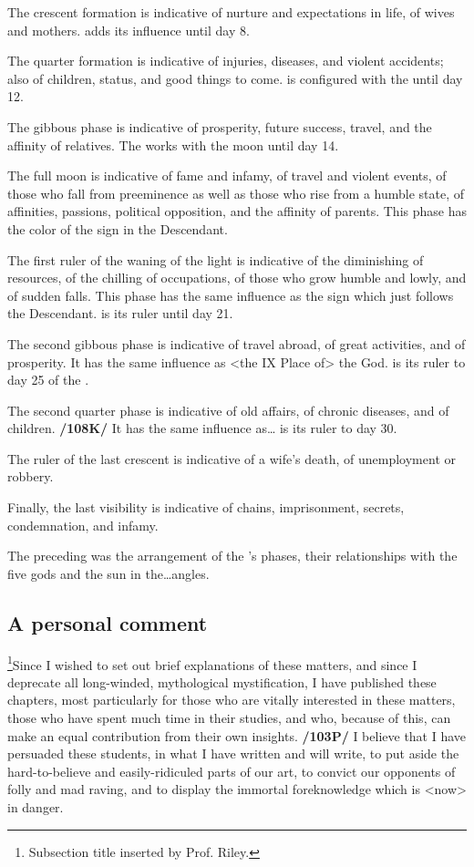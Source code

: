 The crescent formation is indicative of nurture and expectations in life, of wives and mothers. \Mercury\xspace adds its influence until day 8.

The quarter formation is indicative of injuries, diseases, and violent accidents; also of children, status, and good things to come. \Venus\xspace is configured with the \Moon\xspace until day 12.

The gibbous phase is indicative of prosperity, future success, travel, and the affinity of relatives. The \Sun\xspace works with the moon until day 14.

The full moon is indicative of fame and infamy, of travel and violent events, of those who fall from preeminence as well as those who rise from a humble state, of affinities, passions, political opposition, and the affinity of parents. This phase has the color of the sign in the Descendant.

The first ruler of the waning of the light is indicative of the diminishing of resources, of the chilling of occupations, of those who grow humble and lowly, and of sudden falls. This phase has the same influence as the sign which just follows the Descendant. \Mars\xspace is its ruler until day 21.

The second gibbous phase is indicative of travel abroad, of great activities, and of prosperity. It has the same influence as <the IX Place of> the God. \Jupiter\xspace is its ruler to day 25 of the \Moon.

The second quarter phase is indicative of old affairs, of chronic diseases, and of children. \textbf{/108K/} It has
the same influence as\ldots \Saturn\xspace is its ruler to day 30.

The ruler of the last crescent is indicative of a wife’s death, of unemployment or robbery. 

Finally, the last visibility is indicative of chains, imprisonment, secrets, condemnation, and infamy.

The preceding was the arrangement of the \Moon’s phases, their relationships with the five gods and the sun in the\ldots angles.

\subsection{\textlangle A personal comment\textrangle}

\footnote{Subsection title inserted by Prof. Riley.}Since I wished to set out brief explanations of these matters, and since I deprecate all long-winded, mythological mystification, I have published these chapters, most particularly for those who are vitally interested in these matters, those who have spent much time in their studies, and who, because of this, can
make an equal contribution from their own insights. \textbf{/103P/} I believe that I have persuaded these students, in what I have written and will write, to put aside the hard-to-believe and easily-ridiculed parts of our art, to convict our opponents of folly and mad raving, and to display the immortal foreknowledge which is <now> in danger. 

